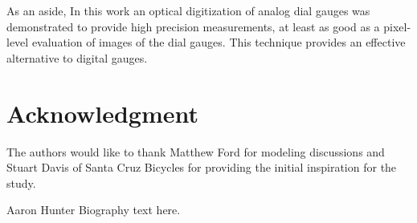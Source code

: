 \documentclass[journal]{IEEEtran}
\begin{document}
As an aside, In this work an optical digitization of analog dial gauges was demonstrated to provide high precision measurements, at least as good as a pixel-level evaluation of images of the dial gauges.  This technique provides an effective alternative to digital gauges. 


\section*{Acknowledgment}
The authors would like to thank Matthew Ford for modeling discussions and Stuart Davis of Santa Cruz Bicycles for providing the initial inspiration for the study.

\ifCLASSOPTIONcaptionsoff
  \newpage
\fi






% 

\begin{IEEEbiography}{Aaron Hunter}
Biography text here.
\end{IEEEbiography}
\end{document}

